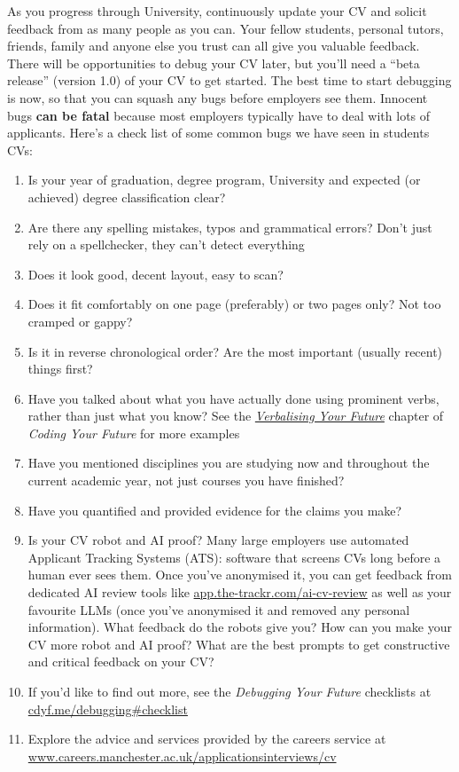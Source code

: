 \documentclass[
]{book}
\providecommand{\tightlist}{%
  \setlength{\itemsep}{0pt}\setlength{\parskip}{0pt}}
\begin{document}
As you progress through University, continuously update your CV and solicit feedback from as many people as you can. Your fellow students, personal tutors, friends, family and anyone else you trust can all give you valuable feedback. There will be opportunities to debug your CV later, but you'll need a ``beta release'' (version 1.0) of your CV to get started. The best time to start debugging is now, so that you can squash any bugs before employers see them. Innocent bugs \textbf{can be fatal} because most employers typically have to deal with lots of applicants. Here's a check list of some common bugs we have seen in students CVs:

\begin{enumerate}
\def\labelenumi{\arabic{enumi}.}
\tightlist
\item
  Is your year of graduation, degree program, University and expected (or achieved) degree classification clear?
\item
  Are there any spelling mistakes, typos and grammatical errors? Don't just rely on a spellchecker, they can't detect everything
\item
  Does it look good, decent layout, easy to scan?
\item
  Does it fit comfortably on one page (preferably) or two pages only? Not too cramped or gappy?
\item
  Is it in reverse chronological order? Are the most important (usually recent) things first?
\item
  Have you talked about what you have actually done using prominent verbs, rather than just what you know? See the \emph{\href{https://www.cdyf.me/verbalising}{Verbalising Your Future}} chapter of \emph{Coding Your Future} for more examples
\item
  Have you mentioned disciplines you are studying now and throughout the current academic year, not just courses you have finished?
\item
  Have you quantified and provided evidence for the claims you make?
\item
  Is your CV robot and AI proof? Many large employers use automated Applicant Tracking Systems (ATS): software that screens CVs long before a human ever sees them. Once you've anonymised it, you can get feedback from dedicated AI review tools like \href{https://app.the-trackr.com/ai-cv-review}{app.the-trackr.com/ai-cv-review} as well as your favourite LLMs (once you've anonymised it and removed any personal information). What feedback do the robots give you? How can you make your CV more robot and AI proof? What are the best prompts to get constructive and critical feedback on your CV?
\item
  If you'd like to find out more, see the \emph{Debugging Your Future} checklists at \href{https://www.cdyf.me/debugging\#checklist}{cdyf.me/debugging\#checklist} \citep{debugyourfuture}
\item
  Explore the advice and services provided by the careers service at \href{https://www.careers.manchester.ac.uk/applicationsinterviews/cv/}{www.careers.manchester.ac.uk/applicationsinterviews/cv}
\end{enumerate}
\end{document}
